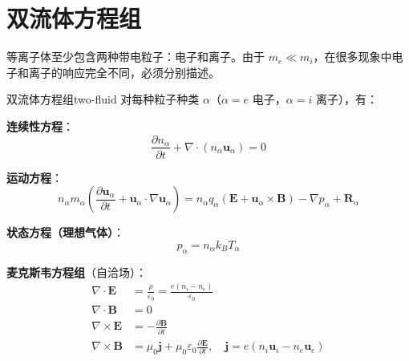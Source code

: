 \documentclass[12pt,a4paper,openany,oneside]{book}
\newcommand{\eps}{\varepsilon}
\newcommand{\vect}[1]{\bm{#1}}
\newcommand{\grad}{\nabla}
\newcommand{\curl}{\nabla\times}
\newcommand{\divg}{\nabla\cdot}
\newcommand{\difficulty}[1]{\marginnote{\hfill\textcolor{coverMid!80}{\rule[-0.1em]{2pt}{0.9em}}\,\textcolor{coverMid}{\footnotesize\textbf{[#1]}}}}
\begin{document}
\section{双流体方程组}\difficulty{提高}

等离子体至少包含两种带电粒子：电子和离子。由于 $m_e \ll m_i$，在很多现象中电子和离子的响应完全不同，必须分别描述。

\begin{theorem}{双流体方程组}{two-fluid}
对每种粒子种类 $\alpha$（$\alpha = e$ 电子，$\alpha = i$ 离子），有：

\textbf{连续性方程}：
\[
\frac{\partial n_\alpha}{\partial t} + \divg(n_\alpha\vect{u}_\alpha) = 0
\]

\textbf{运动方程}：
\[
n_\alpha m_\alpha\left(\frac{\partial\vect{u}_\alpha}{\partial t} + \vect{u}_\alpha\cdot\grad\vect{u}_\alpha\right) = n_\alpha q_\alpha(\vect{E} + \vect{u}_\alpha\times\vect{B}) - \grad p_\alpha + \vect{R}_\alpha
\]

\textbf{状态方程（理想气体）}：
\[
p_\alpha = n_\alpha k_B T_\alpha
\]

\textbf{麦克斯韦方程组}（自洽场）：
\begin{align*}
\divg\vect{E} &= \frac{\rho}{\eps_0} = \frac{e(n_i - n_e)}{\eps_0} \\
\divg\vect{B} &= 0 \\
\curl\vect{E} &= -\frac{\partial\vect{B}}{\partial t} \\
\curl\vect{B} &= \mu_0\vect{j} + \mu_0\eps_0\frac{\partial\vect{E}}{\partial t}, \quad \vect{j} = e(n_i\vect{u}_i - n_e\vect{u}_e)
\end{align*}
\end{theorem}
\end{document}
